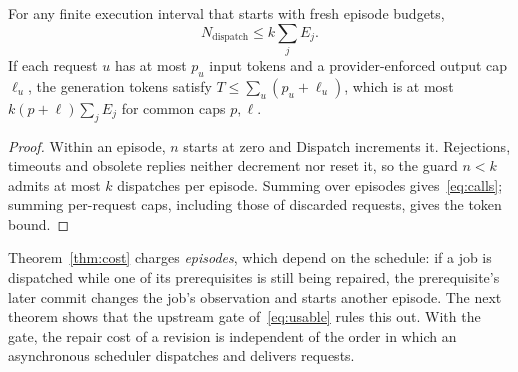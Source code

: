 \begin{theorem}\label{thm:cost}
For any finite execution interval that starts with fresh episode budgets,
\begin{equation}\label{eq:calls}
N_{\mathrm{dispatch}}\le k\textstyle\sum_j E_j.
\end{equation}
If each request $u$ has at most $p_u$ input tokens and a provider-enforced output cap $\ell_u$, the generation tokens satisfy $T\le\sum_{u}(p_u+\ell_u)$, which is at most $k(p+\ell)\sum_jE_j$ for common caps $p,\ell$.
\end{theorem}
\begin{proof}
Within an episode, $n$ starts at zero and Dispatch increments it. Rejections, timeouts and obsolete replies neither decrement nor reset it, so the guard $n<k$ admits at most $k$ dispatches per episode. Summing over episodes gives~\eqref{eq:calls}; summing per-request caps, including those of discarded requests, gives the token bound.
\end{proof}

Theorem~\ref{thm:cost} charges \emph{episodes}, which depend on the schedule: if a job is dispatched while one of its prerequisites is still being repaired, the prerequisite's later commit changes the job's observation and starts another episode. The next theorem shows that the upstream gate of~\eqref{eq:usable} rules this out. With the gate, the repair cost of a revision is independent of the order in which an asynchronous scheduler dispatches and delivers requests.


